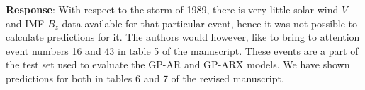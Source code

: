 \documentclass{article}
\begin{document}
\begin{enumerate}
{

\textbf{Response}: With respect to the storm of 1989, there is very little solar wind $V$ and IMF $B_z$ data available for that particular event, hence it was not possible to calculate predictions for it. The authors would however, like to bring to attention event numbers 16 and 43 in table 5 of the manuscript. These events are a part of the test set used to evaluate the GP-AR and GP-ARX models. We have shown predictions for both in tables 6 and 7 of the revised manuscript.


}



\end{enumerate}
\end{document}
